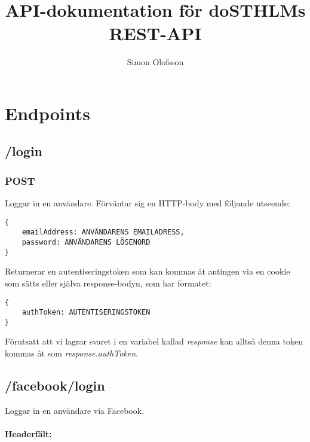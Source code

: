 \documentclass{article}
\title{API-dokumentation för doSTHLMs REST-API}
\author{Simon Olofsson}
\date{}
\begin{document}

\maketitle

\newpage

\tableofcontents

\newpage

\section*{Endpoints}

\subsection*{/login}

\subsubsection*{POST}

Loggar in en användare. Förväntar sig en HTTP-body med följande utseende:

\begin{lstlisting}
{
	emailAddress: ANVÄNDARENS EMAILADRESS,
	password: ANVÄNDARENS LÖSENORD
}
\end{lstlisting}

\noindent Returnerar en autentiseringstoken som kan kommas åt antingen via en cookie som sätts
eller själva response-bodyn, som har formatet:

\begin{lstlisting}
{
	authToken: AUTENTISERINGSTOKEN
}
\end{lstlisting}

\noindent Förutsatt att vi lagrar svaret i en variabel kallad \textit{response} kan alltså denna token 
kommas åt som \textit{response.authToken}.

\subsection*{/facebook/login}
\label{sub:/facebook/login}

Loggar in en användare via Facebook.

\paragraph{Headerfält:}
\label{par:headerf_lt_}
\end{document}

